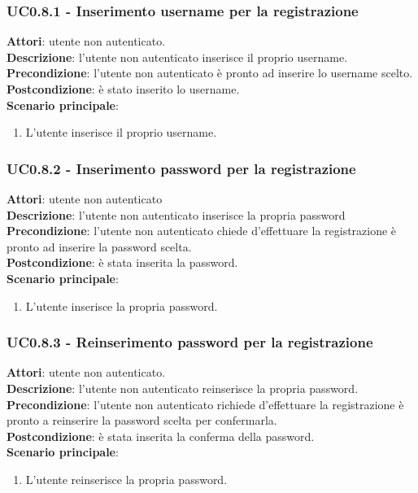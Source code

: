 	\subsubsection{UC0.8.1 - Inserimento username per la registrazione}{
		\label{uc0.8.1}
		\textbf{Attori}: utente non autenticato. \\
		\textbf{Descrizione}: l'utente non autenticato inserisce il proprio username.	\\
		\textbf{Precondizione}: l'utente non autenticato è pronto ad inserire lo username scelto.	\\
		\textbf{Postcondizione}: è stato inserito lo username.\\
		\textbf{Scenario principale}:
		\begin{enumerate}
			\item L'utente inserisce il proprio username.
		\end{enumerate}
		}
	\subsubsection{UC0.8.2 - Inserimento password per la registrazione} {
		\label{uc0.8.2}
		\textbf{Attori}: utente non autenticato \\
		\textbf{Descrizione}: l'utente non autenticato inserisce la propria password	\\
		\textbf{Precondizione}: l'utente non autenticato chiede d'effettuare la registrazione è pronto ad inserire la password scelta.	\\
		\textbf{Postcondizione}: è stata inserita la password.\\
		\textbf{Scenario principale}:
		\begin{enumerate}
			\item L'utente inserisce la propria password.
		\end{enumerate}
		}
	\subsubsection{UC0.8.3 - Reinserimento password per la registrazione} {
		\label{uc0.8.3}
		\textbf{Attori}: utente non autenticato. \\
		\textbf{Descrizione}: l'utente non autenticato reinserisce la propria password.	\\
		\textbf{Precondizione}: l'utente non autenticato richiede d'effettuare la registrazione è pronto a reinserire la password scelta per confermarla.	\\
		\textbf{Postcondizione}: è stata inserita la conferma della password.\\
		\textbf{Scenario principale}:
		\begin{enumerate}
			\item L'utente reinserisce la propria password.
		\end{enumerate}
		}